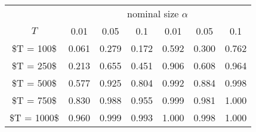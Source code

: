% 
\begin{tabular}{ccccccc}
  \hline
  & \multicolumn{6}{c}{nominal size $\alpha$} \\
 $T$ & 0.01 & 0.05 & 0.1 & 0.01 & 0.05 & 0.1 \\
 \hline
\$T = 100\$ & 0.061 & 0.279 & 0.172 & 0.592 & 0.300 & 0.762 \\ 
  \$T = 250\$ & 0.213 & 0.655 & 0.451 & 0.906 & 0.608 & 0.964 \\ 
  \$T = 500\$ & 0.577 & 0.925 & 0.804 & 0.992 & 0.884 & 0.998 \\ 
  \$T = 750\$ & 0.830 & 0.988 & 0.955 & 0.999 & 0.981 & 1.000 \\ 
  \$T = 1000\$ & 0.960 & 0.999 & 0.993 & 1.000 & 0.998 & 1.000 \\ 
   \hline
\end{tabular}
